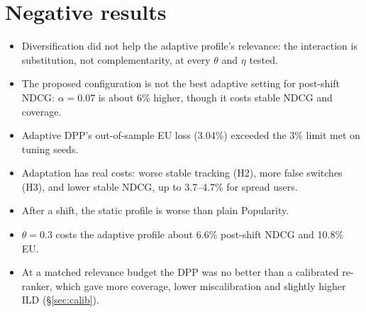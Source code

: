 \documentclass[11pt,a4paper]{article}
\begin{document}
\section{Negative results}\label{sec:negative}
\begin{itemize}
  \item Diversification did not help the adaptive profile's relevance: the interaction is
        substitution, not complementarity, at every $\theta$ and $\eta$ tested.
  \item The proposed configuration is not the best adaptive setting for post-shift NDCG:
        $\alpha=0.07$ is about 6\% higher, though it costs stable NDCG and coverage.
  \item Adaptive DPP's out-of-sample EU loss (3.04\%) exceeded the 3\% limit met on tuning seeds.
  \item Adaptation has real costs: worse stable tracking (H2), more false switches (H3), and
        lower stable NDCG, up to 3.7--4.7\% for spread users.
  \item After a shift, the static profile is worse than plain Popularity.
  \item $\theta=0.3$ costs the adaptive profile about 6.6\% post-shift NDCG and 10.8\% EU.
  \item At a matched relevance budget the DPP was no better than a calibrated re-ranker, which gave
        more coverage, lower miscalibration and slightly higher ILD (\S\ref{sec:calib}).
\end{itemize}

\end{document}
